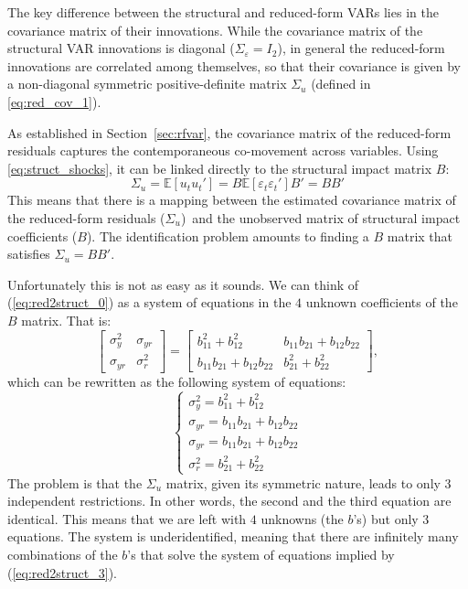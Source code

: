 \documentclass[12pt]{article}
\begin{document}
The key difference between the structural and reduced-form VARs lies in the covariance matrix of their innovations. While the covariance matrix of the structural VAR innovations is diagonal ($\Sigma_{\varepsilon }=I_{2}$), in general the reduced-form innovations are correlated among themselves, so that their covariance is given by a non-diagonal symmetric positive-definite matrix $\Sigma_{u}$ (defined in \eqref{eq:red_cov_1}).

As established in Section~\ref{sec:rfvar}, the covariance matrix of the reduced-form residuals captures the contemporaneous co-movement across variables. Using \eqref{eq:struct_shocks}, it can be linked directly to the structural impact matrix $B$:
\begin{equation}
	\Sigma_{u}=\mathbb{E}\left[ u_{t}u_{t}'\right] =B\mathbb{E}\left[
	\varepsilon_{t}\varepsilon_{t}'\right] B'=BB'
	\label{eq:red2struct_0}
\end{equation}%
This means that there is a mapping between the estimated covariance matrix of the reduced-form residuals ($\Sigma_{u}$)\ and the unobserved matrix of structural impact coefficients ($B$). The identification problem amounts to finding a $B$ matrix that satisfies $\Sigma_{u}=BB'$.

Unfortunately this is not as easy as it sounds. We can think of (\ref{eq:red2struct_0}) as a system of equations in the $4$ unknown coefficients of the $B$ matrix. That is:
\begin{equation}
	\left[
	\begin{array}{cc}
		\sigma _{y}^{2} & \sigma _{yr} \\
		\sigma _{yr} & \sigma _{r}^{2}%
	\end{array}%
	\right] =\left[
	\begin{array}{cc}
		b_{11}^{2}+b_{12}^{2} & b_{11}b_{21}+b_{12}b_{22} \\
		b_{11}b_{21}+b_{12}b_{22} & b_{21}^{2}+b_{22}^{2}%
	\end{array}%
			\right],  \label{eq:red2struct_2}
\end{equation}%
which can be rewritten as the following system of equations:%
\begin{equation}
	\left\{
	\begin{array}{l}
		\sigma _{y}^{2}=b_{11}^{2}+b_{12}^{2} \\
		\sigma _{yr}=b_{11}b_{21}+b_{12}b_{22} \\
		\sigma _{yr}=b_{11}b_{21}+b_{12}b_{22} \\
		\sigma _{r}^{2}=b_{21}^{2}+b_{22}^{2}%
	\end{array}%
	\right.   \label{eq:red2struct_3}
\end{equation}
The problem is that the $\Sigma_{u}$ matrix, given its symmetric nature, leads to only $3$ independent restrictions. In other words, the second and the third equation are identical. This means that we are left with $4$ unknowns (the $b$'s) but only $3$ equations. The system is underidentified, meaning that there are infinitely many combinations of the $b$'s that solve the system of equations implied by (\ref{eq:red2struct_3}).
\end{document}
